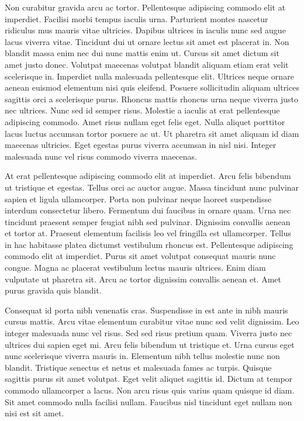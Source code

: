 \documentclass[a4paper,12pt,oneside]{article}
\begin{document}
Non curabitur gravida arcu ac tortor. Pellentesque adipiscing commodo elit at imperdiet. Facilisi morbi tempus iaculis urna. Parturient montes nascetur ridiculus mus mauris vitae ultricies. Dapibus ultrices in iaculis nunc sed augue lacus viverra vitae. Tincidunt dui ut ornare lectus sit amet est placerat in. Non blandit massa enim nec dui nunc mattis enim ut. Cursus sit amet dictum sit amet justo donec. Volutpat maecenas volutpat blandit aliquam etiam erat velit scelerisque in. Imperdiet nulla malesuada pellentesque elit. Ultrices neque ornare aenean euismod elementum nisi quis eleifend. Posuere sollicitudin aliquam ultrices sagittis orci a scelerisque purus. Rhoncus mattis rhoncus urna neque viverra justo nec ultrices. Nunc sed id semper risus. Molestie a iaculis at erat pellentesque adipiscing commodo. Amet risus nullam eget felis eget. Nulla aliquet porttitor lacus luctus accumsan tortor posuere ac ut. Ut pharetra sit amet aliquam id diam maecenas ultricies. Eget egestas purus viverra accumsan in nisl nisi. Integer malesuada nunc vel risus commodo viverra maecenas.

At erat pellentesque adipiscing commodo elit at imperdiet. Arcu felis bibendum ut tristique et egestas. Tellus orci ac auctor augue. Massa tincidunt nunc pulvinar sapien et ligula ullamcorper. Porta non pulvinar neque laoreet suspendisse interdum consectetur libero. Fermentum dui faucibus in ornare quam. Urna nec tincidunt praesent semper feugiat nibh sed pulvinar. Dignissim convallis aenean et tortor at. Praesent elementum facilisis leo vel fringilla est ullamcorper. Tellus in hac habitasse platea dictumst vestibulum rhoncus est. Pellentesque adipiscing commodo elit at imperdiet. Purus sit amet volutpat consequat mauris nunc congue. Magna ac placerat vestibulum lectus mauris ultrices. Enim diam vulputate ut pharetra sit. Arcu ac tortor dignissim convallis aenean et. Amet purus gravida quis blandit.

Consequat id porta nibh venenatis cras. Suspendisse in est ante in nibh mauris cursus mattis. Arcu vitae elementum curabitur vitae nunc sed velit dignissim. Leo integer malesuada nunc vel risus. Sed sed risus pretium quam. Viverra justo nec ultrices dui sapien eget mi. Arcu felis bibendum ut tristique et. Urna cursus eget nunc scelerisque viverra mauris in. Elementum nibh tellus molestie nunc non blandit. Tristique senectus et netus et malesuada fames ac turpis. Quisque sagittis purus sit amet volutpat. Eget velit aliquet sagittis id. Dictum at tempor commodo ullamcorper a lacus. Non arcu risus quis varius quam quisque id diam. Sit amet commodo nulla facilisi nullam. Faucibus nisl tincidunt eget nullam non nisi est sit amet.
\end{document}
